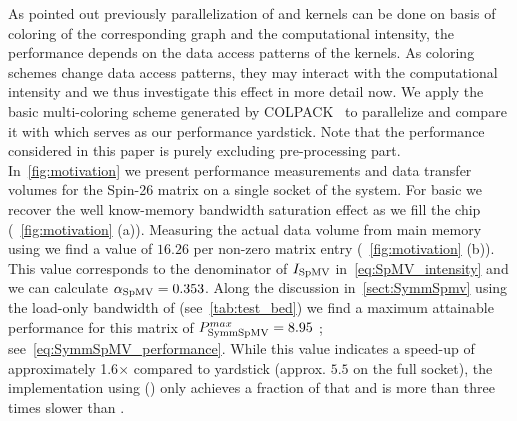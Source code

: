 
As pointed out previously parallelization of \SymmSpmv and \SYMMKACZ kernels can be done on basis of \DTWO coloring of the corresponding graph and the computational intensity, \ie the performance depends on the data access patterns of the kernels. As coloring schemes change data access patterns, they may interact with the computational intensity and we thus investigate this effect in more detail now. We apply  the basic multi-coloring scheme generated by COLPACK~\cite{COLPACK} to parallelize \SymmSpmv and compare it with \SpMV which serves as our performance yardstick. Note that the performance considered in this paper is purely excluding pre-processing part. In~\cref{fig:motivation} we present performance measurements and data transfer volumes for the Spin-26 matrix on a single socket of the \IVB system. For basic \SpMV we recover the well know-memory bandwidth saturation effect as we fill the chip (~\cref{fig:motivation} (a)). Measuring the actual data volume from main memory using \LIKWID we find a value of $16.26$ \BYTE per non-zero matrix entry (~\cref{fig:motivation} (b)). This value corresponds to the denominator of $I_\mathrm{SpMV}$ in~\cref{eq:SpMV_intensity} and we can calculate $\alpha_\mathrm{SpMV}=0.353$. Along the discussion in~\cref{sect:SymmSpmv} using the load-only bandwidth of \IVB (see~\cref{tab:test_bed}) we find a maximum attainable {\SymmSpmv} performance for this matrix of $P^{max}_\mathrm{SymmSpMV}=8.95$ \GF; see~\cref{eq:SymmSpMV_performance}. While this value indicates a speed-up of approximately 1.6$\times$ compared to \SpMV yardstick (approx. $5.5$ \GF on the full socket), the \SymmSpmv implementation using \MCfull (\MC) only achieves a fraction of that and is more than three times slower than \SpMV. 



